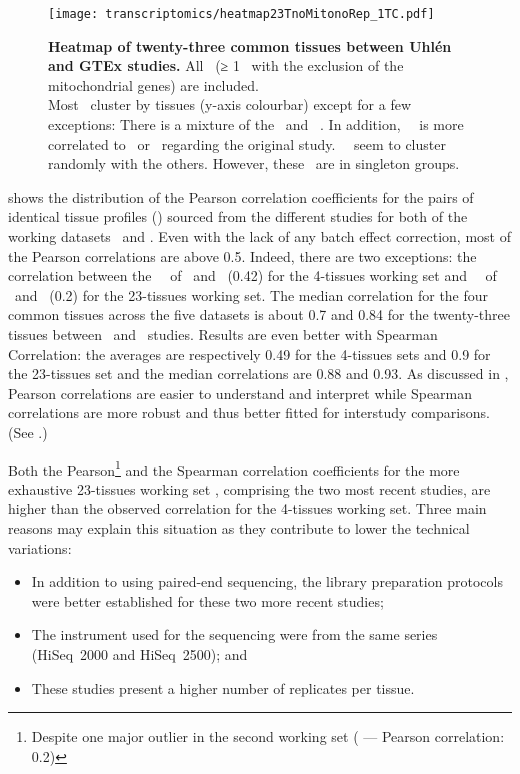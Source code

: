\begin{figure}[!htpb]
    \texttt{[image: transcriptomics/heatmap23TnoMitonoRep\_1TC.pdf]}\centering
    \caption[Heatmap of 23 common tissues between Uhlén and GTEx studies]%
    {\label{fig:noMitoNoRep23T}%
    \textbf{Heatmap of twenty-three common tissues between Uhlén and GTEx studies.}
    All \pcgs\ (≥ 1 \FPKM\ with the exclusion of the mitochondrial
    genes) are included.\\Most \treps\ cluster by tissues (y-axis colourbar)
    except for a few exceptions:
    There is a mixture of the \fallopian\
    and \Ovary\ \treps.
    In addition, \Salivary\ \treps\ is more correlated to
    \Esophagus\ or \Stomach\ regarding the original study.
    \Bladder\ \treps\ seem to cluster randomly with the others.
    However, these \treps\ are in singleton groups.}
\end{figure}

 shows the distribution of the Pearson correlation
coefficients for the pairs of identical tissue profiles (\treps)
sourced from the different studies
for both of the working datasets \setOne\ and \setTwo.
Even with the lack of any batch effect correction,
most of the Pearson correlations are above 0.5.
Indeed,
there are two exceptions: the
correlation between the \Testis\ \treps\ of \castle\ and \vt\ (0.42)
for the 4-tissues working set and
\Salivary\ \treps\ of \uhlen\ and \gtex\ (0.2)
for the 23-tissues working set.
The median correlation for the four common tissues across the five datasets is
about 0.7 and 0.84 for the twenty-three tissues between \uhlen\ and \gtex\ studies.
Results are even better with Spearman Correlation:
the averages are respectively 0.49 for the 4-tissues sets
and 0.9 for the 23-tissues set and
the median correlations are 0.88 and 0.93.
As discussed in ,
Pearson correlations are easier to understand and interpret
while Spearman correlations are more robust and thus better fitted for interstudy
comparisons.
(See .)

Both\label{seg:betterTreps} the
Pearson\footnote{Despite one major outlier in the second
working set ( --- Pearson correlation: 0.2)} and the
Spearman correlation coefficients for the more exhaustive 23-tissues working set
\setTwo,
comprising the two most recent studies,
are higher than the observed correlation for the 4-tissues working set.
Three main reasons may explain this situation as they contribute to lower
the technical variations:
\vspace{-3mm}
\begin{itemize}[topsep=0pt,nosep]
    \item In addition to using paired-end sequencing,
        the library preparation protocols were better established
        for these two more recent studies;
    \item The instrument used for the sequencing were
        from the same series (HiSeq~2000 and HiSeq~2500); and
    \item These studies present a higher number of replicates per tissue.
\end{itemize}

